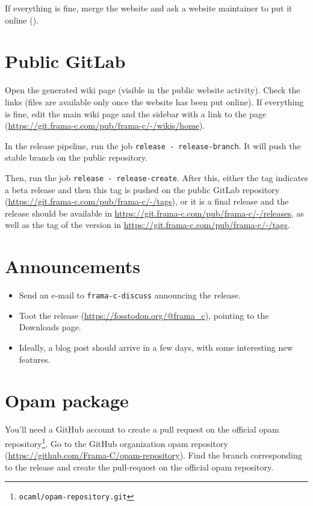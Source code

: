 If everything is fine, merge the website and ask a website maintainer to put it
online ().

\section{Public GitLab}

Open the generated wiki page (visible in the public website activity). Check the
links (files are available only once the website has been put online). If
everything is fine, edit the main wiki page and the sidebar with a link to the
page (\url{https://git.frama-c.com/pub/frama-c/-/wikis/home}).

In the release pipeline, run the job \texttt{release - release-branch}. It will
push the stable branch on the public repository.

Then, run the job \texttt{release - release-create}. After this, either the
tag indicates a beta release and then this tag is pushed on the public GitLab
repository (\url{https://git.frama-c.com/pub/frama-c/-/tags}), or it is a final
release and the release should be available in
\url{https://git.frama-c.com/pub/frama-c/-/releases}, as well as the tag of the
version in \url{https://git.frama-c.com/pub/frama-c/-/tags}.

\section{Announcements}

\begin{itemize}
\item Send an e-mail to \texttt{frama-c-discuss} announcing the release.
\item Toot the release (\url{https://fosstodon.org/@frama_c}),
  pointing to the Downloads page.
\item Ideally, a blog post should arrive in a few days, with some interesting
  new features.
\end{itemize}

\section{Opam package}

You'll need a GitHub account to create a pull request on the official opam
repository\footnote{\texttt{ocaml/opam-repository.git}}. Go to the \FramaC
GitHub organization opam repository (\url{https://github.com/Frama-C/opam-repository}).
Find the branch corresponding to the release and create the pull-request on the
official opam repository.


